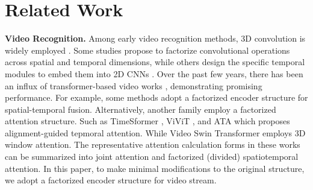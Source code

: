 \section{Related Work}
\label{sec:related work}
\textbf{Video Recognition.} Among early video recognition methods, 3D convolution is widely employed \cite{qiu2017learning,tran2015learning,tran2018closer,xie2018rethinking,feichtenhofer2019slowfast,feichtenhofer2020x3d,yu2021searching}. Some studies \cite{qiu2017learning,tran2018closer,xie2018rethinking} propose to factorize convolutional operations across spatial and temporal dimensions, while others design the specific temporal modules to embed them into 2D CNNs \cite{li2020tea,lin2019tsm,liu2021tam}. Over the past few years, there has been an influx of transformer-based video works \cite{arnab2021vivit,neimark2021video,bertasius2021space,fan2021multiscale,liu2022video,yan2022multiview,li2022uniformer}, demonstrating promising performance. For example, some methods \cite{arnab2021vivit,neimark2021video,girdhar2021anticipative} adopt a factorized encoder structure for spatial-temporal fusion. Alternatively, another family employ a factorized attention structure. Such as TimeSformer \cite{bertasius2021space}, ViViT \cite{arnab2021vivit}, and ATA \cite{zhao2022alignment} which proposes alignment-guided tepmoral attention. While Video Swin Transformer \cite{liu2022video} employs 3D window attention. The representative attention calculation forms in these works can be summarized into joint attention and factorized (divided) spatiotemporal attention. In this paper, to make minimal modifications to the original structure, we adopt a factorized encoder structure for video stream. 

